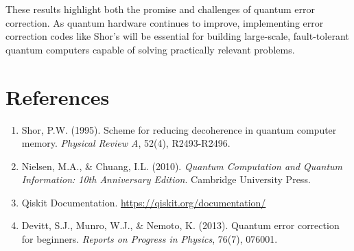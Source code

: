 \documentclass[12pt,a4paper]{article}
\begin{document}
These results highlight both the promise and challenges of quantum error correction. As quantum hardware continues to improve, implementing error correction codes like Shor's will be essential for building large-scale, fault-tolerant quantum computers capable of solving practically relevant problems.

\section{References}

\begin{enumerate}
    \item Shor, P.W. (1995). Scheme for reducing decoherence in quantum computer memory. \textit{Physical Review A}, 52(4), R2493-R2496.
    \item Nielsen, M.A., \& Chuang, I.L. (2010). \textit{Quantum Computation and Quantum Information: 10th Anniversary Edition}. Cambridge University Press.
    \item Qiskit Documentation. \url{https://qiskit.org/documentation/}
    \item Devitt, S.J., Munro, W.J., \& Nemoto, K. (2013). Quantum error correction for beginners. \textit{Reports on Progress in Physics}, 76(7), 076001.
\end{enumerate}
\end{document}
